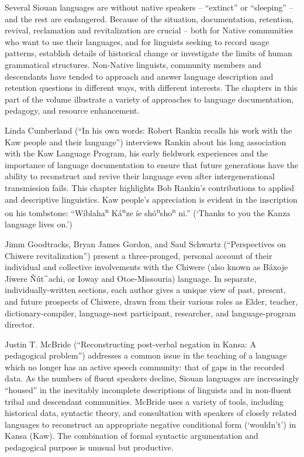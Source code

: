 \begin{refsection}

Several Siouan languages are without native speakers -- ``extinct'' or ``sleeping'' -- and the rest are endangered. Because of the situation, documentation, retention, revival, reclamation and revitalization are crucial -- both for Native communities who want to use their languages, and for linguists seeking to record usage patterns, establish details of historical change or investigate the limits of human grammatical structures. Non-Native linguists, community members and descendants have tended to approach and answer language description and retention questions in different ways, with different interests. The chapters in this part of the volume illustrate a variety of approaches to language documentation, pedagogy, and resource enhancement.

Linda Cumberland (``In his own words: Robert Rankin recalls his work with the Kaw people and their language'') interviews Rankin about his long association with the Kaw Language Program, his early fieldwork experiences and the importance of language documentation to ensure that future generations have the ability to reconstruct and revive their language even after intergenerational transmission fails. This chapter highlights Bob Rankin's contributions to applied and descriptive linguistics. Kaw people's appreciation is evident in the inscription on his tombstone: ``W\'iblaha\textsuperscript{n} K\'a\textsuperscript{n}ze \'ie sh\'o\textsuperscript{n}sho\textsuperscript{n} ni.'' (`Thanks to you the Kanza language lives on.')

Jimm Goodtracks, Bryan James Gordon, and Saul Schwartz (``Perspectives on Chiwere revitalization'') present a three-pronged, personal account of their individual and collective involvements with the Chiwere (also known as Báxoje Jíwere \~{N}út\^{}achi, or Ioway and Otoe-Missouria) language. In separate, individually-written sections, each author gives a unique view of past, present, and future prospects of Chiwere, drawn from their various roles as Elder, teacher, dictionary-compiler, language-nest participant, researcher, and language-program director. 

Justin T. McBride (``Reconstructing post-verbal negation in Kansa: A pedagogical problem'') addresses a common issue in the teaching of a language which no longer has an active speech community: that of gaps in the recorded data. As the numbers of fluent speakers decline, Siouan languages are increasingly ``housed'' in the inevitably incomplete descriptions of linguists and in non-fluent tribal and descendant communities. McBride uses a variety of tools, including historical data, syntactic theory, and consultation with speakers of closely related languages to reconstruct an appropriate negative conditional form (`wouldn't') in Kansa (Kaw). The combination of formal syntactic argumentation and pedagogical purpose is unusual but productive. 


\end{refsection}
